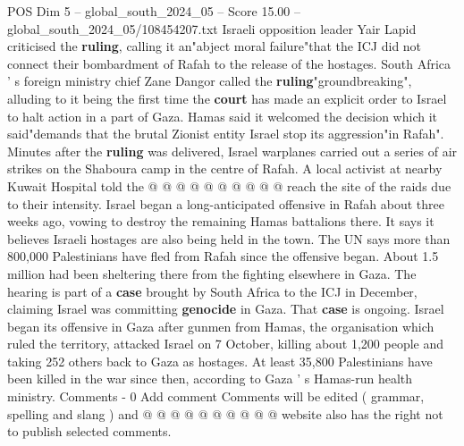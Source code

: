 \begin{textsample}{POS Dim 5 – global\_south\_2024\_05 – Score 15.00 – global\_south\_2024\_05/108454207.txt}
Israeli opposition leader Yair Lapid criticised the \textbf{ruling}, calling it an"abject moral failure"that the ICJ did not connect their bombardment of Rafah to the release of the hostages.
South Africa ' s foreign ministry chief Zane Dangor called the \textbf{ruling}"groundbreaking", alluding to it being the first time the \textbf{court} has made an explicit order to Israel to halt action in a part of Gaza.
Hamas said it welcomed the decision which it said"demands that the brutal Zionist entity Israel stop its aggression"in Rafah".
Minutes after the \textbf{ruling} was delivered, Israel warplanes carried out a series of air strikes on the Shaboura camp in the centre of Rafah.
A local activist at nearby Kuwait Hospital told the @ @ @ @ @ @ @ @ @ @ reach the site of the raids due to their intensity.
Israel began a long-anticipated offensive in Rafah about three weeks ago, vowing to destroy the remaining Hamas battalions there.
It says it believes Israeli hostages are also being held in the town.
The UN says more than 800,000 Palestinians have fled from Rafah since the offensive began.
About 1.5 million had been sheltering there from the fighting elsewhere in Gaza.
The hearing is part of a \textbf{case} brought by South Africa to the ICJ in December, claiming Israel was committing \textbf{genocide} in Gaza.
That \textbf{case} is ongoing.
Israel began its offensive in Gaza after gunmen from Hamas, the organisation which ruled the territory, attacked Israel on 7 October, killing about 1,200 people and taking 252 others back to Gaza as hostages.
At least 35,800 Palestinians have been killed in the war since then, according to Gaza ' s Hamas-run health ministry.
Comments - 0 Add comment Comments will be edited ( grammar, spelling and slang ) and @ @ @ @ @ @ @ @ @ @ website also has the right not to publish selected comments.

\end{textsample}
